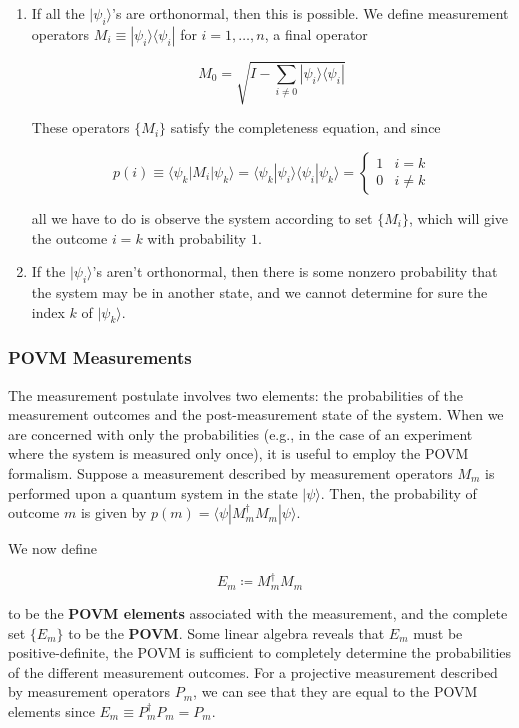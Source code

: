 \documentclass{article}
\theoremstyle{definition}
\begin{document}
      \begin{enumerate}
        \item If all the $|\psi_i \rangle$'s are orthonormal, then this is possible. We define measurement operators $M_i \equiv |\psi_i \rangle \langle \psi_i |$ for $i = 1, \ldots, n$, a final operator

          \[M_0 = \sqrt{I - \sum_{i\neq 0} |\psi_i \rangle \langle \psi_i |}\]

        These operators $\{M_i\}$ satisfy the completeness equation, and since

          \[p(i) \equiv \langle \psi_k | M_i | \psi_k \rangle = \langle \psi_k | \psi_i \rangle \langle \psi_i | \psi_k \rangle = \begin{cases} 1 & i = k \\ 0 & i \neq k \end{cases}\]

        all we have to do is observe the system according to set $\{M_i\}$, which will give the outcome $i=k$ with probability $1$.

        \item If the $|\psi_i\rangle$'s aren't orthonormal, then there is some nonzero probability that the system may be in another state, and we cannot determine for sure the index $k$ of $|\psi_k \rangle$.
      \end{enumerate}

    \subsubsection{POVM Measurements}

      The measurement postulate involves two elements: the probabilities of the measurement outcomes and the post-measurement state of the system. When we are concerned with only the probabilities (e.g., in the case of an experiment where the system is measured only once), it is useful to employ the POVM formalism. Suppose a measurement described by measurement operators $M_m$ is performed upon a quantum system in the state $|\psi\rangle$. Then, the probability of outcome $m$ is given by $p(m) = \langle \psi | M_m^\dagger M_m | \psi \rangle$. 

      We now define

        \[E_m \coloneqq M_m^\dagger M_m\]

      to be the \textbf{POVM elements} associated with the measurement, and the complete set $\{E_m\}$ to be the \textbf{POVM}. Some linear algebra reveals that $E_m$ must be positive-definite, the POVM is sufficient to completely determine the probabilities of the different measurement outcomes. For a projective measurement described by measurement operators $P_m$, we can see that they are equal to the POVM elements since $E_m \equiv P_m^\dagger P_m = P_m$.
\end{document}
